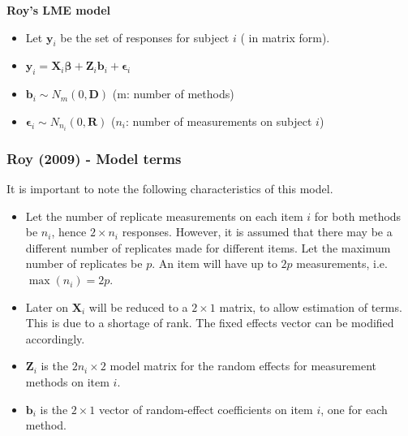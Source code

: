 \documentclass[compress]{beamer}        %
\makeatletter
\newcommand{\tcb}{\textcolor{beamer@blendedblue}}
\makeatother
\begin{document}
\begin{frame}{\bf \tcb{Roy's LME model}}
\begin{itemize}\itemsep0.7cm

\item Let $\boldsymbol{y}_i$ be the set of responses for subject $i$ ( in matrix form).
\item $\boldsymbol{y}_i = \boldsymbol{X}_i\boldsymbol{\beta} + \boldsymbol{Z}_i \boldsymbol{b}_i + \boldsymbol{\epsilon}_i$
\item $\boldsymbol{b}_i \sim N_m(0,\boldsymbol{D})$  (m: number of methods)
\item $\boldsymbol{\epsilon}_i \sim N_{n_i}(0,\boldsymbol{R})$ ($n_i$: number of measurements on subject $i$)
\end{itemize}
\end{frame}






\begin{frame}
\frametitle{Roy (2009) -  Model terms}
It is important to note the following characteristics of this model.
\begin{itemize}\itemsep0.0cm
\item Let the number of replicate measurements on each item $i$ for both methods be $n_i$, hence $2 \times n_i$ responses. However, it is assumed that there may be a different number of replicates made for different items. Let the maximum number of replicates be $p$. An item will have up to $2p$ measurements, i.e. $\max(n_{i}) = 2p$.


\item Later on $\boldsymbol{X}_i$ will be reduced to a $2 \times 1$ matrix, to allow estimation of terms. This is due to a shortage of rank. The fixed effects vector can be modified accordingly.
\item $\boldsymbol{Z}_i$ is the $2n_i \times  2$ model matrix for the random effects for measurement methods on item $i$.
\item $\boldsymbol{b}_i$ is the $2 \times  1$ vector of random-effect coefficients on item $i$, one for each method.
\end{itemize}
\end{frame}
\end{document}
